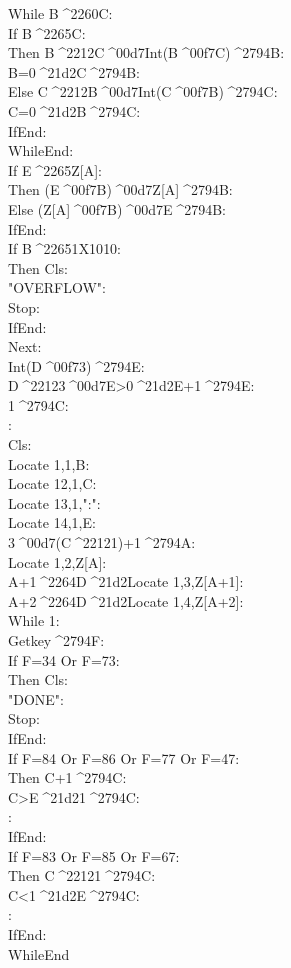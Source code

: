\documentclass[11pt,letterpaper,twocolumn]{article}
\newcommand{\STO}{{\large ^^^^2794}}
\newcommand{\CBR}{{\Large ^^^^21d2}}
\newcommand{\NEQ}{^^^^2260}
\newcommand{\LEQ}{^^^^2264}
\newcommand{\GEQ}{^^^^2265}
\newcommand{\MUL}{^^^^00d7}
\newcommand{\DIV}{^^^^00f7}
\newcommand{\MINUS}{^^^^2212}
\newcommand{\EXPTEN}{{\scriptsize X10}}
\newcommand{\IDENT}[1]{\hspace*{#1\BaseIndent}}
\begin{document}
\begin{linenumbers}
\IDENT{1}While B\NEQ C:\\
\IDENT{2}If B\GEQ C:\\
\IDENT{3}Then B\MINUS C\MUL Int(B\DIV C)\STO B:\\
\IDENT{3}B=0\CBR C\STO B:\\
\IDENT{2}Else C\MINUS B\MUL Int(C\DIV B)\STO C:\\
\IDENT{3}C=0\CBR B\STO C:\\
\IDENT{2}IfEnd:\\
\IDENT{1}WhileEnd:\\
\IDENT{1}If E\GEQ Z[A]:\\
\IDENT{2}Then (E\DIV B)\MUL Z[A]\STO B:\\
\IDENT{1}Else (Z[A]\DIV B)\MUL E\STO B:\\
\IDENT{1}IfEnd:\\
\IDENT{1}If B\GEQ 1\EXPTEN10:\\
\IDENT{2}Then Cls:\\
\IDENT{2}"OVERFLOW":\\
\IDENT{2}Stop:\\
\IDENT{1}IfEnd:\\
Next:\\
Int(D\DIV 3)\STO E:\\
D\MINUS 3\MUL E>0\CBR E+1\STO E:\\
1\STO C:\\
:\\
Cls:\\
Locate 1,1,B:\\
Locate 12,1,C:\\
Locate 13,1,":":\\
Locate 14,1,E:\\
3\MUL (C\MINUS 1)+1\STO A:\\
Locate 1,2,Z[A]:\\
A+1\LEQ D\CBR Locate 1,3,Z[A+1]:\\
A+2\LEQ D\CBR Locate 1,4,Z[A+2]:\\
While 1:\\
\IDENT{1}Getkey\STO F:\\
\IDENT{1}If F=34 Or F=73:\\
\IDENT{2}Then Cls:\\
\IDENT{2}"DONE":\\
\IDENT{2}Stop:\\
\IDENT{1}IfEnd:\\
\IDENT{1}If F=84 Or F=86 Or F=77 Or F=47:\\
\IDENT{2}Then C+1\STO C:\\
\IDENT{2}C>E\CBR 1\STO C:\\
\IDENT{2}:\\
\IDENT{1}IfEnd:\\
\IDENT{1}If F=83 Or F=85 Or F=67:\\
\IDENT{2}Then C\MINUS 1\STO C:\\
\IDENT{2}C<1\CBR E\STO C:\\
\IDENT{2}:\\
\IDENT{1}IfEnd:\\
WhileEnd
\end{linenumbers}
\end{document}
